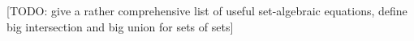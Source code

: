 [TODO: give a rather comprehensive list of useful set-algebraic equations, define big intersection and big union for sets of sets]










